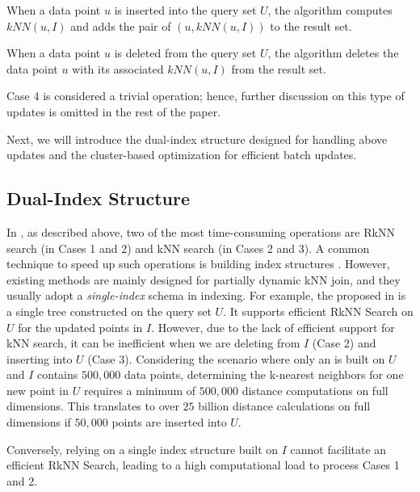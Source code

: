 %
When a data point $u$ is inserted into the query set $U$, the algorithm computes $kNN(u,I)$ and adds the pair of $(u,kNN(u,I))$ to the result set.

%
When a data point $u$ is deleted from the query set $U$, the algorithm deletes the data point $u$ with its associated $kNN(u,I)$ from the result set.

\begin{remark}
    Case 4 is considered a trivial operation; hence, further discussion on this type of updates is omitted in the rest of the paper.
\end{remark}

Next, we will introduce the dual-index structure designed for handling above updates and the cluster-based optimization for efficient batch updates.


\subsection{Dual-Index Structure}

 
In \fdknnj, as described above, two of the most time-consuming operations are RkNN search (in Cases 1 and 2) and kNN search (in Cases 2 and 3). A common technique to speed up such operations is building index structures \cite{lin1994tv, ciaccia1997m, yu2001indexing, bohm2004k, xia2004gorder, jagadish2005idistance, yu2007efficient, yu2010high, yang2014continuous}.
%
However, existing methods are mainly designed for partially dynamic kNN join, and they usually adopt a \emph{single-index} schema in indexing.
%
For example, the \hdrtree proposed in \cite{yang2014continuous} is a single tree constructed on the query set $U$. It supports efficient RkNN Search on $U$ for the updated points in $I$. However, due to the lack of efficient support for kNN search, it can be inefficient when we are deleting from $I$ (Case 2) and inserting into $U$ (Case 3).
%
Considering the scenario where only an \hdrtree is built on $U$ and $I$ contains $500,000$ data points, determining the k-nearest neighbors for one new point in $U$ requires a minimum of $500,000$ distance computations on full dimensions. This translates to over $25$ billion distance calculations on full dimensions if $50,000$ points are inserted into $U$.

Conversely, relying on a single index structure built on $I$ cannot facilitate an efficient RkNN Search, leading to a high computational load to process Cases 1 and 2.

